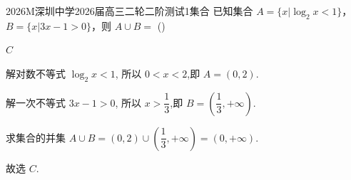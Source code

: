 
\begin{problem}{2026}{M}{深圳中学2026届高三二轮二阶测试}{1}{集合}
已知集合 $A=\{x|\log_2 x<1\}$，$B=\{x|3x-1>0\}$，则 $A\cup B=$ (\hspace{1cm})
\begin{choices}
\choice{{$\left(\dfrac{1}{3},2\right]$}}
\end{choices}
\end{problem}

\begin{answer}
$C$
\end{answer}

\begin{solutions}
解对数不等式 $\log_2 x < 1$, 所以 $0 < x < 2$,即 $A = (0, 2)$.

解一次不等式 $3x - 1 > 0$, 所以 $x > \displaystyle \dfrac{1}{3}$,即 $B = \left(\displaystyle \dfrac{1}{3}, +\infty\right)$.

求集合的并集 $A \cup B = (0, 2) \cup \left(\displaystyle \dfrac{1}{3}, +\infty\right) = (0, +\infty)$.

故选 $C$.
\end{solutions}